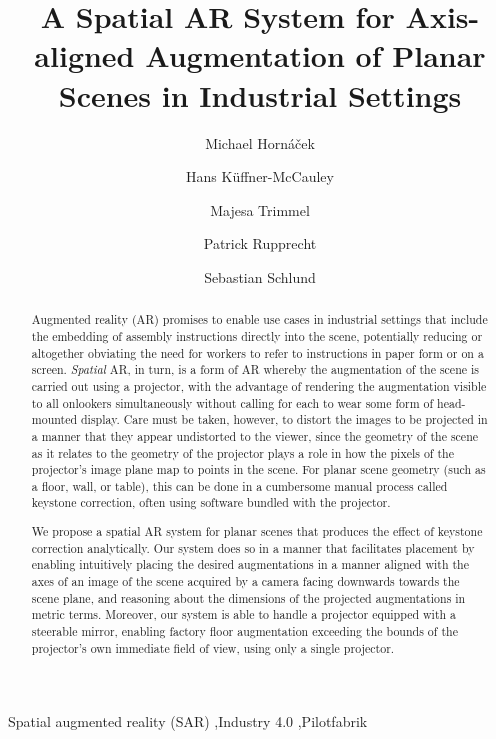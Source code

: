 \documentclass[review]{elsarticle}
\begin{document}
\begin{frontmatter}

\title{A Spatial AR System for Axis-aligned Augmentation of Planar Scenes in Industrial Settings} %

\author{Michael Horn\'{a}\v{c}ek}
\author{Hans K\"{u}ffner-McCauley}
\author{Majesa Trimmel}
\author{Patrick Rupprecht}
\author{Sebastian Schlund}
\address{Human Centered Cyber Physical Production and Assembly Systems, Institute for Management Sciences, TU Vienna, Austria}

\begin{abstract}
Augmented reality (AR) promises to enable use cases in industrial settings that include the embedding of assembly instructions directly into the scene, potentially reducing or altogether obviating the need for workers to refer to instructions in paper form or on a screen. \textit{Spatial} AR, in turn, is a form of AR whereby the augmentation of the scene is carried out using a projector, with the advantage of rendering the augmentation visible to all onlookers simultaneously without calling for each to wear some form of head-mounted display. Care must be taken, however, to distort the images to be projected in a manner that they appear undistorted to the viewer, since the geometry of the scene as it relates to the geometry of the projector plays a role in how the pixels of the projector's image plane map to points in the scene. For planar scene geometry (such as a floor, wall, or table), this can be done in a cumbersome manual process called keystone correction, often using software bundled with the projector.

We propose a spatial AR system for planar scenes that produces the effect of keystone correction analytically. Our system does so in a manner that facilitates placement by enabling intuitively placing the desired augmentations in a manner aligned with the axes of an image of the scene acquired by a camera facing downwards towards the scene plane, and reasoning about the dimensions of the projected augmentations in metric terms. Moreover, our system is able to handle a projector equipped with a steerable mirror, enabling factory floor augmentation exceeding the bounds of the projector's own immediate field of view, using only a single projector.
\end{abstract}

\begin{keyword}
Spatial augmented reality (SAR) \sep Industry 4.0 \sep Pilotfabrik
\end{keyword}

\end{frontmatter}
\end{document}
